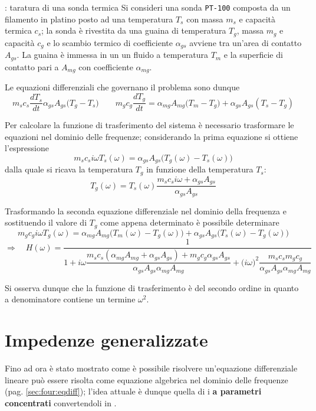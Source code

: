 	
	
	
	
	\begin{esempio}{: taratura di una sonda termica}
		Si consideri una sonda \texttt{PT-100} composta da un filamento in platino posto ad una temperatura $T_s$ con massa $m_s$ e capacità termica $c_s$; la sonda è rivestita da una guaina di temperatura $T_g$, massa $m_g$ e capacità $c_g$ e lo scambio termico di coefficiente $\alpha_{gs}$ avviene tra un'area di contatto $A_{gs}$. La guaina è immessa in un un fluido a temperatura $T_m$ e la superficie di contatto pari a $A_{mg}$ con coefficiente $\alpha_{mg}$.
		
		Le equazioni differenziali che governano il problema sono dunque
		\[ m_s c_s \frac{dT_s}{dt} \alpha_{gs} A_{gs} \big(T_g -T_s\big) \qquad m_g c_g \frac{dT_g}{dt} = \alpha_{mg} A_{mg} \big(T_m-T_g\big) + \alpha_{gs}A_{gs}(T_s- T_g)\]
		
		Per calcolare la funzione di trasferimento del sistema è necessario trasformare le equazioni nel dominio delle frequenze; considerando la prima equazione si ottiene l'espressione
		\[m_s c_s i\omega T_s(\omega) = \alpha_{gs} A_{gs}\Big( T_{g}(\omega) - T_{s}(\omega)\Big) \]
		dalla quale si ricava la temperatura $T_g$ in funzione della temperatura $T_s$:
		\[ T_g(\omega) = T_s(\omega) \frac{m_s c_s i\omega + \alpha_{gs} A_{gs}}{\alpha_{gs}A_{gs}} \]
		
		Trasformando la seconda equazione differenziale nel dominio della frequenza e sostituendo il valore di $T_g$ come appena determinato è possibile determinare
		\[ m_g c_g i\omega T_g(\omega) = \alpha_{mg} A_{mg} \Big(T_m(\omega) - T_g(\omega)\Big) + \alpha_{gs} A_{gs} \Big(T_s(\omega) - T_g(\omega)\Big) \]
		\[ \Rightarrow \quad H(\omega) = \frac 1 {1 + i\omega \dfrac{m_s c_s (\alpha_{mg} A_{mg} + \alpha_{gs} A_{gs} ) + m_g c_g \alpha_{gs} A_{gs} }{\alpha_{gs} A_{gs}\alpha_{mg} A_{mg} }  + \big(i\omega\big)^2 \dfrac{m_s c_s m_g c_g}{\alpha_{gs} A_{gs} \alpha_{mg} A_{mg} } } \]
		
		Si osserva dunque che la funzione di trasferimento è del secondo ordine in quanto a denominatore contiene un termine $\omega^2$.
		
	\end{esempio}
	
\section{Impedenze generalizzate}
	Fino ad ora è stato mostrato come è possibile risolvere un'equazione differenziale lineare può essere risolta come equazione algebrica nel dominio delle frequenze (pag. \ref{sec:four:eqdiff}); l'idea attuale è dunque quella di  i  \textbf{a parametri concentrati} convertendoli in .
	
